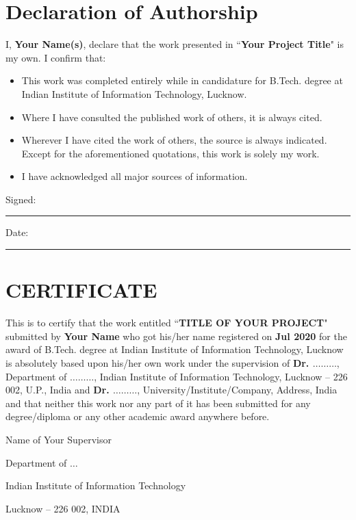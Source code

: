 \thispagestyle{empty}

\setcounter{page}{3}

\chapter*{Declaration of Authorship}

\vspace{1cm}

\noindent 
I, \textbf{Your Name(s)}, declare that the work presented in ``\textbf{Your Project Title}" is my own. I confirm that:

\medskip

\begin{itemize} 
    \item This work was completed entirely while in candidature for B.Tech. degree at Indian Institute of Information Technology, Lucknow.
    
    \medskip
    
    \item Where I have consulted the published work of others, it is always cited.
    
    \medskip
    
    \item Wherever I have cited the work of others, the source is always indicated. Except for the aforementioned quotations, this work is solely my work.
    
    \medskip
    
    \item I have acknowledged all major sources of information.
\end{itemize}

\vspace{2cm}

\noindent Signed:\\

\rule[0.5em]{33em}{0.5pt} 
 
\noindent Date:\\

\rule[0.5em]{33em}{0.5pt}

\cleardoublepage

\chapter*{CERTIFICATE}

This is to certify that the work entitled ``\textbf{TITLE OF YOUR PROJECT}" submitted by \textbf{Your Name} who got his/her name registered on \textbf{\;\;\; Jul 2020} for the award of B.Tech. degree at Indian Institute of Information Technology, Lucknow is absolutely based upon his/her own work under the supervision of \textbf{Dr. $\dots\dots\dots$}, Department of $\dots\dots\dots$, Indian Institute of Information Technology, Lucknow -- 226 002, U.P., India and \textbf{Dr. $\dots\dots\dots$}, University/Institute/Company, Address, India and that neither this work nor any part of it has been submitted for any degree/diploma or any other academic award anywhere before.  

\vspace{4cm}

\begin{center}
    Name of Your Supervisor

    Department of $\dots$ 

    Indian Institute of Information Technology 

    Lucknow -- 226 002, INDIA 
\end{center}

